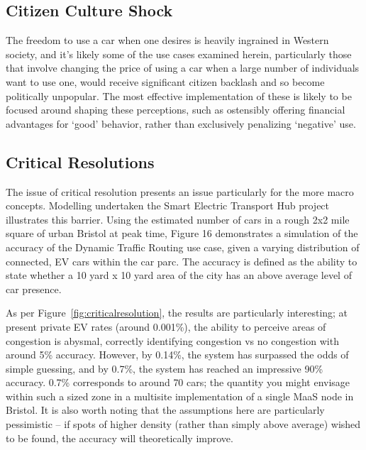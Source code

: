 \documentclass[journal]{IEEEtran}
\begin{document}
\subsection{Citizen Culture Shock}

The freedom to use a car when one desires is heavily ingrained in
Western society, and it's likely some of the use cases examined
herein, particularly those that involve changing the price of using a
car when a large number of individuals want to use one, would receive
significant citizen backlash and so become politically unpopular. The
most effective implementation of these is likely to be focused around
shaping these perceptions, such as ostensibly offering financial
advantages for `good' behavior, rather than exclusively penalizing
`negative' use. 

\subsection{Critical Resolutions}

The issue of critical resolution presents an issue particularly for
the more macro concepts.  Modelling undertaken the Smart Electric
Transport Hub project illustrates this barrier. Using the estimated
number of cars in a rough 2x2 mile square of urban Bristol at peak
time, Figure 16 demonstrates a simulation of the accuracy of the
Dynamic Traffic Routing use case, given a varying distribution of
connected, EV cars within the car parc. The accuracy is defined as the
ability to state whether a 10 yard x 10 yard area of the city has an
above average level of car presence.

As per Figure~\ref{fig:criticalresolution}, the results are
particularly interesting; at present private EV rates (around
0.001\%), the ability to perceive areas of congestion is abysmal,
correctly identifying congestion vs no congestion with around 5\%
accuracy. However, by 0.14\%, the system has surpassed the odds of
simple guessing, and by 0.7\%, the system has reached an impressive
90\% accuracy. 0.7\% corresponds to around 70 cars; the quantity you
might envisage within such a sized zone in a multisite implementation
of a single MaaS node in Bristol. It is also worth noting that the
assumptions here are particularly pessimistic -- if spots of higher
density (rather than simply above average) wished to be found, the
accuracy will theoretically improve.
\end{document}
